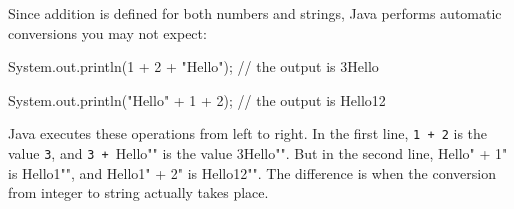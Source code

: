 \documentclass[12pt]{book}
\makeatletter
\theoremstyle{exercise}
\newcommand{\java}[1]{\verb"#1"}
\renewcommand{\section}{\@startsection{section}{1}{\z@}%
    {-3.5ex \@plus -1ex \@minus -.2ex}%
    {0.7ex \@plus.2ex}%
    {\normalfont\Large\bfseries}}
\newcommand{\java}[1]{\lstinline{#1}} %
\makeatother
\begin{document}

Since addition is defined for both numbers and strings, Java performs automatic conversions you may not expect:


\begin{code}
    System.out.println(1 + 2 + "Hello");
    // the output is 3Hello

    System.out.println("Hello" + 1 + 2);
    // the output is Hello12
\end{code}

Java executes these operations from left to right.
In the first line, \java{1 + 2} is the value \java{3}, and \java{3 + "Hello"} is the value \java{"3Hello"}.
But in the second line, \java{"Hello" + 1} is \java{"Hello1"}, and \java{"Hello1" + 2} is \java{"Hello12"}.
The difference is when the conversion from integer to string actually takes place.

%





\end{document}
